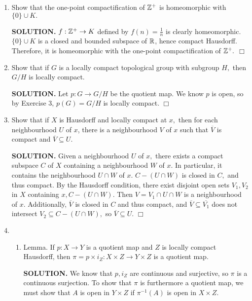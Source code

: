 \documentclass{article}
\begin{document}
\begin{enumerate}
    \item Show that the one-point compactification of $\mathbb{Z}^+$ is homeomorphic with $\{0\} \cup K.$

    {\bf SOLUTION.} $f: \mathbb{Z}^+ \rightarrow K$ defined by $f(n) = \frac1n$ is clearly homeomorphic. $\{0\} \cup K$ is a closed and bounded subspace of $\mathbb{R}$, hence compact Hausdorff. Therefore, it is homeomorphic with the one-point compactification of $\mathbb{Z}^+.$ $\Box$

    \item Show that if $G$ is a locally compact topological group with subgroup $H,$ then $G/H$ is locally compact.

    {\bf SOLUTION.} Let $p: G \rightarrow G/H$ be the quotient map. We know $p$ is open, so by Exercise 3, $p(G) = G/H$ is locally compact. $\Box$

    \item Show that if $X$ is Hausdorff and locally compact at $x,$ then for each neighbourhood $U$ of $x$, there is a neighbourhood $V$ of $x$ such that $\overline{V}$ is compact and $\overline{V} \subseteq U.$

    {\bf SOLUTION.} Given a neighbourhood $U$ of $x,$ there exists a compact subspace $C$ of $X$ containing a neighbourhood $W$ of $x.$ In particular, it contains the neighbourhood $U \cap W$ of $x$. $C-(U \cap W)$ is closed in $C,$ and thus compact. By the Hausdorff condition, there exist disjoint open sets $V_1, V_2$ in $X$ containing $x, C-(U \cap W).$ Then $V = V_1 \cap U \cap W$ is a neighbourhood of $x.$ Additionally, $\overline{V}$ is closed in $C$ and thus compact, and $\overline{V} \subseteq \overline{V_1}$ does not intersect $V_2 \subseteq C-(U \cap W),$ so $\overline{V} \subseteq U.$ $\Box$

    \item \begin{enumerate}
        \item Lemma. If $p: X \rightarrow Y$ is a quotient map and $Z$ is locally compact Hausdorff, then $\pi = p \times i_Z: X \times Z \rightarrow Y \times Z$ is a quotient map.

        {\bf SOLUTION.} We know that $p, i_Z$ are continuous and surjective, so $\pi$ is a continuous surjection. To show that $\pi$ is furthermore a quotient map, we must show that $A$ is open in $Y \times Z$ if $\pi^{-1}(A)$ is open in $X \times Z.$


\end{enumerate}
\end{enumerate}
\end{document}
